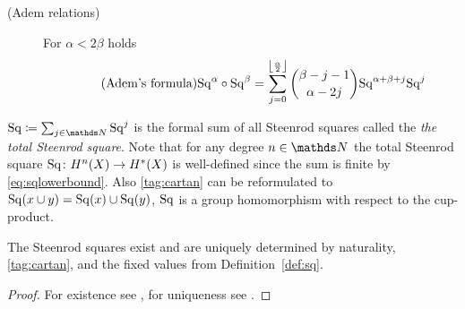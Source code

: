 \begin{Def}
\begin{description}
  \item[(Adem relations)] For $\alpha<2\beta$ holds
    \begin{gather}\label{tag:adem}\tag{Adem's formula}
      \mathrm{Sq}^{\alpha} \circ \mathrm{Sq}^{\beta} =
      \sum_{j=0}^{\left\lfloor \frac \alpha 2 \right\rfloor}
      \binom{\beta-j-1}{\alpha-2j}
      \mathrm{Sq}^{\alpha+\beta+j}\mathrm{Sq}^{j}
    \end{gather}
  \end{description}
  $\SQ\coloneqq \sum_{j\in\Nat}\Sq j$ is the formal sum of all
  Steenrod squares called the \emph{the total Steenrod square}.
  Note that for any degree $n\in\Nat$ the total Steenrod square
  $\mathrm{Sq}\colon H^n(X)\to H^*(X)$ is well-defined since the sum is
  finite by \eqref{eq:sqlowerbound}.
  Also \ref{tag:cartan} can be reformulated to
  $\mathrm{Sq}(x\cup y) = \mathrm{Sq}(x)\cup\mathrm{Sq}(y)$, \idest $\mathrm{Sq}$ is a group
  homomorphism with respect to the cup-product.
\end{Def}

\begin{Thm}
  The Steenrod squares exist and are uniquely determined by
  naturality, \ref{tag:cartan}, and the fixed values
  from Definition~\ref{def:sq}.
  \begin{proof}
    For existence see \cite[Chapter 2]{mosher},
    for uniqueness see \cite[VIII §3]{steenrodepstein}.
  \end{proof}
\end{Thm}


